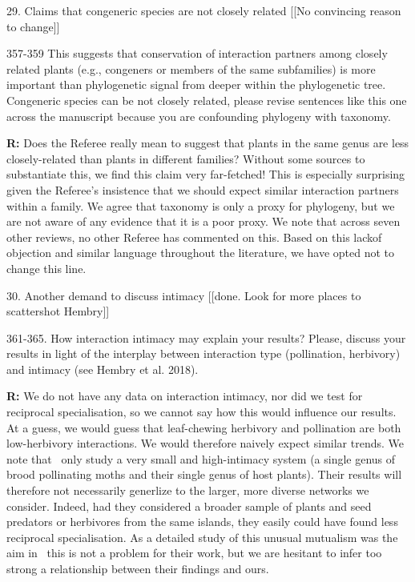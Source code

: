 \documentclass[12pt]{letter}
\newenvironment{refquote}{\bigskip \begin{it}}{\end{it}\smallskip}
\begin{document}
	29. Claims that congeneric species are not closely related [[No convincing reason to change]]

		\begin{refquote}
			357-359 This suggests that conservation of interaction partners among closely related plants (e.g., congeners or members of the same subfamilies) is more important than phylogenetic signal from deeper within the phylogenetic tree. Congeneric species can be not closely related, please revise sentences like this one across the manuscript because you are confounding phylogeny with taxonomy.
		\end{refquote}


		\textbf{R:} Does the Referee really mean to suggest that plants in the same genus are less closely-related than plants in different families? Without some sources to substantiate this, we find this claim very far-fetched! This is especially surprising given the Referee's insistence that we should expect similar interaction partners within a family. We agree that taxonomy is only a proxy for phylogeny, but we are not aware of any evidence that it is a poor proxy. We note that across seven other reviews, no other Referee has commented on this. Based on this lackof objection and similar language throughout the literature, we have opted not to change this line.



	30. Another demand to discuss intimacy [[done. Look for more places to scattershot Hembry]]

		\begin{refquote}
			361-365. How interaction intimacy may explain your results? Please, discuss your results in light of the interplay between interaction type (pollination, herbivory) and intimacy (see Hembry et al. 2018).
		\end{refquote}


		\textbf{R:} We do not have any data on interaction intimacy, nor did we test for reciprocal specialisation, so we cannot say how this would influence our results. At a guess, we would guess that leaf-chewing herbivory and pollination are both low-herbivory interactions. We would therefore naively expect similar trends. We note that~\citet{Hembry2018} only study a very small and high-intimacy system (a single genus of brood pollinating moths and their single genus of host plants). Their results will therefore not necessarily generlize to the larger, more diverse networks we consider. Indeed, had they considered a broader sample of plants and seed predators or herbivores from the same islands, they easily could have found less reciprocal specialisation. As a detailed study of this unusual mutualism was the aim in~\citet{Hembry2018} this is not a problem for their work, but we are hesitant to infer too strong a relationship between their findings and ours.
\end{document}

